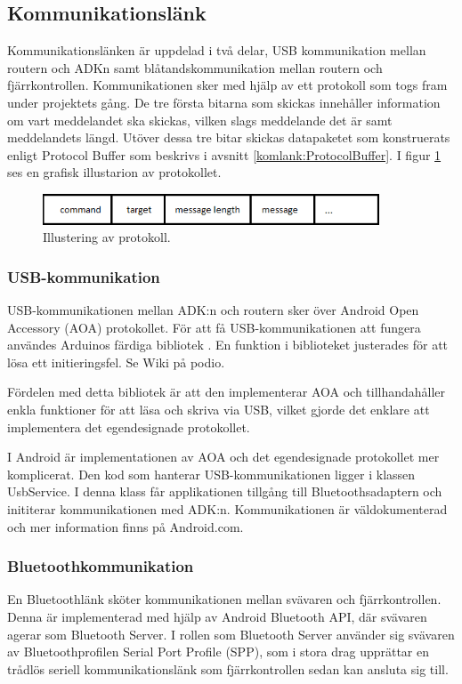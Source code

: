 \subsection{Kommunikationslänk}
\label{subsec:commlink}
Kommunikationslänken är uppdelad i två delar, USB kommunikation mellan routern och ADKn 
samt blåtandskommunikation mellan routern och fjärrkontrollen. Kommunikationen sker med hjälp av ett protokoll som 
togs fram under projektets gång. De tre första bitarna som skickas innehåller information om vart meddelandet ska skickas, 
vilken slags meddelande det är samt meddelandets längd. Utöver dessa tre bitar skickas datapaketet som konstruerats enligt 
Protocol Buffer som beskrivs i avsnitt \ref{komlank:ProtocolBuffer}. I figur \ref{fig:protocol} ses en grafisk illustarion av protokollet.


\begin{figure}[htbp!]
\centering
\includegraphics[width=10cm]{../../includes/figures/protocol.png}
\caption{Illustering av protokoll.}
\label{fig:protocol}
\end{figure}

\subsubsection{USB-kommunikation}
USB-kommunikationen mellan ADK:n och routern sker över Android Open Accessory (AOA) protokollet. 
För att få USB-kommunikationen att fungera användes Arduinos färdiga bibliotek
\cite{USBHost}. En funktion i biblioteket justerades för att lösa ett
initieringsfel. Se Wiki på podio.
 
Fördelen med detta bibliotek är att den implementerar AOA och tillhandahåller enkla funktioner för att läsa och skriva via USB, vilket 
gjorde det enklare att implementera det egendesignade protokollet.

I Android är implementationen av AOA och det egendesignade protokollet mer komplicerat. Den kod som hanterar USB-kommunikationen ligger 
i klassen UsbService. I denna klass får applikationen tillgång till
Bluetoothsadaptern och inititerar kommunikationen med ADK:n.
Kommunikationen är väldokumenterad och mer information finns på Android.com.
 
\subsubsection{Bluetoothkommunikation}
En Bluetoothlänk sköter kommunikationen mellan svävaren och fjärrkontrollen.
Denna är implementerad med hjälp av Android Bluetooth API, där svävaren agerar
som Bluetooth Server. I rollen som Bluetooth Server använder sig svävaren av
Bluetoothprofilen Serial Port Profile (SPP), som i stora drag upprättar en
trådlös seriell kommunikationslänk som fjärrkontrollen sedan kan ansluta sig
till.

